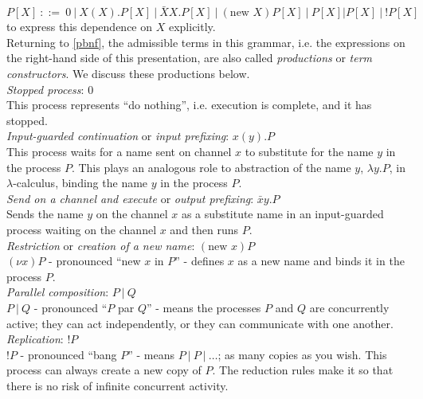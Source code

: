 \documentclass[12pt]{article}
\numberwithin{equation}{section}
\begin{document}
\[ P[X] \ ::= \ 0 \ | \ X(X).P[X] \ | \ \bar{X} X .P[X] \ | \ (\text{new } X)P[X] \ | \ P[X] | P[X] \ | \ !P[X] \]
to express this dependence on $X$ explicitly. \\

Returning to \eqref{pbnf}, the admissible terms in this grammar, i.e. the expressions on the right-hand side of this presentation, are also called \emph{productions} or \emph{term constructors}. We discuss these productions below. \\

\emph{Stopped process}: $0$ \\
This process represents ``do nothing'', i.e. execution is complete, and it has stopped. \\

\emph{Input-guarded continuation} or \emph{input prefixing}: $x(y).P$ \\
This process waits for a name sent on channel $x$ to substitute for the name $y$ in the process $P$. This plays an analogous role to abstraction of the name $y$, $\lambda y.P$, in $\lambda$-calculus, binding the name $y$ in the process $P$. \\

\emph{Send on a channel and execute} or \emph{output prefixing}: $\bar{x} y .P$ \\
Sends the name $y$ on the channel $x$ as a substitute name in an input-guarded process waiting on the channel $x$ and then runs $P$. \\

\emph{Restriction} or \emph{creation of a new name}: $(\text{new } x)P$ \\
$(\nu x)P$ - pronounced ``new $x$ in $P$'' - defines $x$ as a new name and binds it in the process $P$. \\

\emph{Parallel composition}: $P \ | \ Q$ \\
$P \ | \ Q$ - pronounced ``$P$ par $Q$'' - means the processes $P$ and $Q$ are concurrently active; they can act independently, or they can communicate with one another. \\

\emph{Replication}: $!P$ \\
$!P$ - pronounced ``bang $P$'' - means $P \ | \ P \ | \ \dots$; as many copies as you wish. This process can always create a new copy of $P$. The reduction rules make it so that there is no risk of infinite concurrent activity. \\
\end{document}
